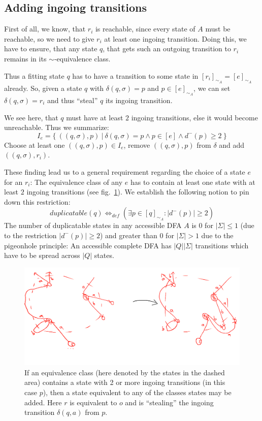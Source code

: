 \subsection{Adding ingoing transitions}

First of all, we know, that $r_i$ is reachable, since every state of $A$ must be reachable, so we need to give $r_i$ at least one ingoing transition. Doing this, we have to ensure, that any state $q$, that gets such an outgoing transition to $r_i$ remains in its $\sim$-equivalence class.
	
Thus a fitting state $q$ has to have a transition to some state in $[r_i]_{\sim_A} = [e]_{\sim_A}$ already. So, given a state $q$ with $\delta(q, \sigma) = p$ and $p \in [e]_{\sim_A}$, we can set $\delta(q, \sigma) = r_i$ and thus ``steal'' $q$ its ingoing transition.

We see here, that $q$ must have at least $2$ ingoing transitions, else it would become unreachable. Thus we summarize:
\[
    I_e = \{\ ((q, \sigma), p)\ |\ \delta(q, \sigma) = p \land p \in [e] \land d^-(p) \geq 2\ \}
\]
Choose at least one $((q, \sigma), p) \in I_e$, remove $((q, \sigma), p)$ from $\delta$ and add $((q, \sigma), r_i)$. 

These finding lead us to a general requirement regarding the choice of a state $e$ for an $r_i$: The equivalence class of any $e$ has to contain at least one state with at least $2$ ingoing transitions (see fig.~\ref{fig:dfa_create_equivalent_states}). We establish the following notion to pin down this restriction:
\[
	duplicatable(q) \Leftrightarrow_{def} (\exists p \in [q]_{\sim_A}\colon |d^-(p)| \geq 2)
\]
The number of duplicatable states in any accessible DFA $A$ is $0$ for $|\Sigma| \leq 1$ (due to the restriction $|d^-(p)| \geq 2$) and greater than $0$ for $|\Sigma| > 1$ due to the pigeonhole principle: An accessible complete DFA has $|Q||\Sigma|$ transitions which have to be spread across $|Q|$ states.
\begin{figure}
	\includegraphics[width=\linewidth]{images/dfa_create_equivalent_states.png}
	\caption{If an equivalence class (here denoted by the states in the dashed area) contains a state with 2 or more ingoing transitions (in this case $p$), then a state equivalent to any of the classes states may be added. Here $r$ is equivalent to $o$ and is ``stealing'' the ingoing transition $\delta(q, a)$ from $p$.}
	\label{fig:dfa_create_equivalent_states}
\end{figure}


